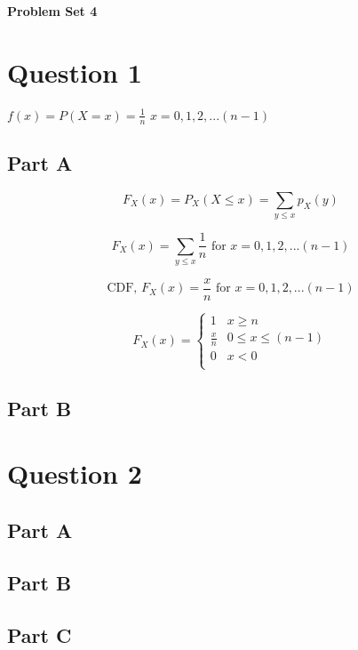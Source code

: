 \documentclass[letterpaper]{article}
\begin{document}
\vspace*{6pt}

\noindent \textbf{\huge{Problem Set 4}}

\bigskip

\section*{Question 1}

\centerline{ $f(x) = P(X = x) = \frac{1}{n}$ \space \space \space \space $x = 0, 1, 2, ... (n-1)$ }

\subsection*{Part A}

$$F_X(x) = P_X(X \leq x) = \sum_{y \leq x} p_X (y)$$

$$F_X(x) = \sum_{y \leq x} \frac{1}{n} \text{ for } x = 0, 1, 2, ... (n-1)$$

$$\text{CDF, } F_X(x) = \frac{x}{n} \text{ for } x = 0, 1, 2, ... (n-1)$$

$$ F_X(x) = \begin{cases}
    1               &   x \geq n    \\
    \frac{x}{n}     &   0 \leq x \leq (n-1) \\
    0               &   x < 0   \\
\end{cases} $$

\subsection*{Part B}

\newpage

\section*{Question 2}

\subsection*{Part A}

\subsection*{Part B}

\subsection*{Part C}
\end{document}
